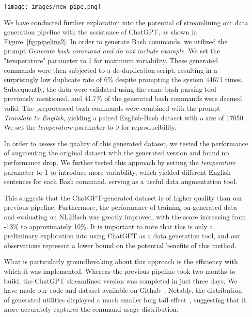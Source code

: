 \documentclass{river-journal}
\begin{document}
\begin{figure*}
    \centering
    \texttt{[image: images/new\_pipe.png]}
    \caption{Streamlined Pipeline of the Dataset Generation and Translation}
    \label{fig:pipeline2}
\end{figure*}

We have conducted further exploration into the potential of streamlining our data generation pipeline with the assistance of ChatGPT, as shown in Figure~\ref{fig:pipeline2}. In order to generate Bash commands, we utilized the prompt \textit{Generate bash command and do not include example}. We set the "temperature" parameter to 1 for maximum variability. These generated commands were then subjected to a de-duplication script, resulting in a surprisingly low duplicate rate of 6\% despite prompting the system 44671 times. Subsequently, the data were validated using the same bash parsing tool previously mentioned, and 41.7\% of the generated bash commands were deemed valid. The preprocessed bash commands were combined with the prompt \textit{Translate to English}, yielding a paired English-Bash dataset with a size of 17050. We set the \textit{temperature} parameter to 0 for reproducibility.

In order to assess the quality of this generated dataset, we tested the performance of augmenting the original dataset with the generated version and found no performance drop. We further tested this approach by setting the \textit{temperature} parameter to 1 to introduce more variability, which yielded different English sentences for each Bash command, serving as a useful data augmentation tool.

This suggests that the ChatGPT-generated dataset is of higher quality than our previous pipeline. Furthermore, the performance of training on generated data and evaluating on NL2Bash was greatly improved, with the score increasing from -13\% to approximately 10\%. It is important to note that this is only a preliminary exploration into using ChatGPT as a data generation tool, and our observations represent a lower bound on the potential benefits of this method.

What is particularly groundbreaking about this approach is the efficiency with which it was implemented. Whereas the previous pipeline took two months to build, the ChatGPT streamlined version was completed in just three days. We have made our code and dataset available on Github~\cite{BashGen2022}. Notably, the distribution of generated utilities displayed a much smaller long tail effect~\cite{shen2023data}, suggesting that it more accurately captures the command usage distribution.
\end{document}
